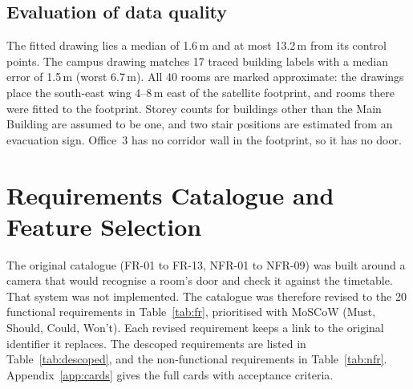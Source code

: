 \documentclass[12pt,a4paper]{report}
\begin{document}
\subsection{Evaluation of data quality}\label{sec:quality}
The fitted drawing lies a median of 1.6\,m and at most 13.2\,m from its control points. The campus drawing matches 17 traced building labels with a median error of 1.5\,m (worst 6.7\,m). All 40 rooms are marked approximate: the drawings place the south-east wing 4--8\,m east of the satellite footprint, and rooms there were fitted to the footprint. Storey counts for buildings other than the Main Building are assumed to be one, and two stair positions are estimated from an evacuation sign. Office~3 has no corridor wall in the footprint, so it has no door.

\section{Requirements Catalogue and Feature Selection}\label{sec:catalogue}
The original catalogue (FR-01 to FR-13, NFR-01 to NFR-09) was built around a camera that would recognise a room's door and check it against the timetable. That system was not implemented. The catalogue was therefore revised to the 20 functional requirements in Table~\ref{tab:fr}, prioritised with MoSCoW (Must, Should, Could, Won't). Each revised requirement keeps a link to the original identifier it replaces. The descoped requirements are listed in Table~\ref{tab:descoped}, and the non-functional requirements in Table~\ref{tab:nfr}. Appendix~\ref{app:cards} gives the full cards with acceptance criteria.
\end{document}
